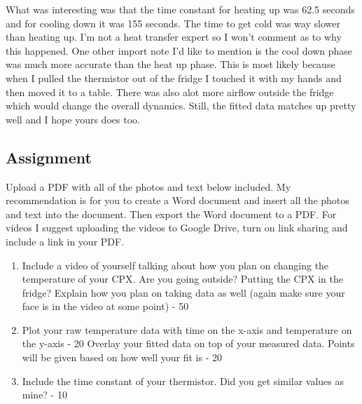 What was interesting was that the time constant for heating up was 62.5 seconds and for cooling down it was 155 seconds. The time to get cold was way slower than heating up. I’m not a heat transfer expert so I won’t comment as to why this happened. One other import note I’d like to mention is the cool down phase was much more accurate than the heat up phase. This is most likely because when I pulled the thermistor out of the fridge I touched it with my hands and then moved it to a table. There was also alot more airflow outside the fridge which would change the overall dynamics. Still, the fitted data matches up pretty well and I hope yours does too.

\subsection{Assignment}

Upload a PDF with all of the photos and text below included. My recommendation is for you to create a Word document and insert all the photos and text into the document. Then export the Word document to a PDF. For videos I suggest uploading the videos to Google Drive, turn on link sharing and include a link in your PDF.
\begin{enumerate}
\item Include a video of yourself talking about how you plan on changing the temperature of your CPX. Are you going outside? Putting the CPX in the fridge? Explain how you plan on taking data as well (again make sure your face is in the video at some point) - 50%
\item Plot your raw temperature data with time on the x-axis and temperature on the y-axis - 20%
Overlay your fitted data on top of your measured data. Points will be given based on how well your fit is - 20%
\item Include the time constant of your thermistor. Did you get similar values as mine? - 10%
\end{enumerate}